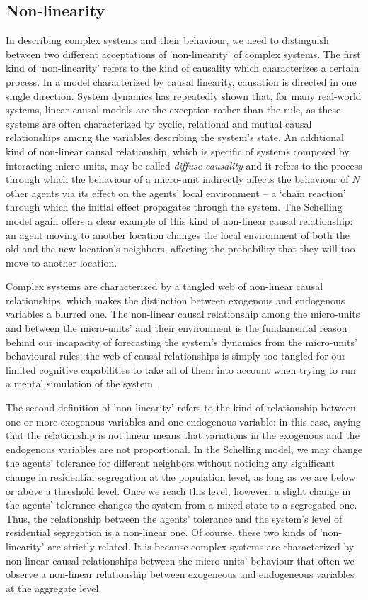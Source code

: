 \documentclass[review]{elsarticle}
\begin{document}
\subsection{Non-linearity}
In describing complex systems and their behaviour, we need to distinguish between two different acceptations of 'non-linearity' of complex systems. The first kind of `non-linearity' refers to the kind of causality which characterizes a certain process. In a model characterized by causal linearity, causation is directed in one single direction. System dynamics has repeatedly shown that, for many real-world systems, linear causal models are the exception rather than the rule, as these systems are often characterized by cyclic, relational and mutual causal relationships among the variables describing the system's state. An additional kind of non-linear causal relationship, which is specific of systems composed by interacting micro-units, may be called \textit{diffuse causality} and it refers to the process through which the behaviour of a micro-unit indirectly affects the behaviour of $N$ other agents via its effect on the agents' local environment -- a `chain reaction' through which the initial effect propagates through the system. The Schelling model again offers a clear example of this kind of non-linear causal relationship: an agent moving to another location changes the local environment of both the old and the new location's neighbors, affecting the probability that they will too move to another location. 

Complex systems are characterized by a tangled web of non-linear causal relationships, which makes the distinction between exogenous and endogenous variables a blurred one. The non-linear causal relationship among the micro-units and between the micro-units' and their environment is the fundamental reason behind our incapacity of forecasting the system's dynamics from the micro-units' behavioural rules: the web of causal relationships is simply too tangled for our limited cognitive capabilities to take all of them into account when trying to run a mental simulation of the system. 

The second definition of 'non-linearity' refers to the kind of relationship between one or more exogenous variables and one endogenous variable: in this case, saying that the relationship is not linear means that variations in the exogenous and the endogenous variables are not proportional. In the Schelling model, we may change the agents' tolerance for different neighbors without noticing any significant change in residential segregation at the population level, as long as we are below or above a threshold level. Once we reach this level, however, a slight change in the agents' tolerance changes the system from a mixed state to a segregated one. Thus, the relationship between the agents' tolerance and the system's level of residential segregation is a non-linear one. Of course, these two kinds of 'non-linearity' are strictly related. It is because complex systems are characterized by non-linear causal relationships between the micro-units' behaviour that often we observe a non-linear relationship between exogeneous and endogeneous variables at the aggregate level.\\
\end{document}
